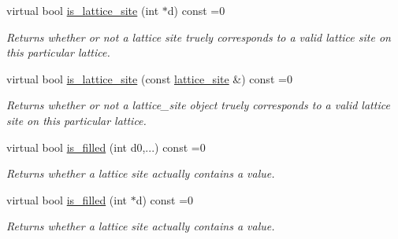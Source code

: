 \begin{DoxyCompactItemize}
\mbox{\label{classsisl_1_1base__lattice_affd433798fb68d45b7265c0bd5e9e1ac}} 
virtual bool \hyperlink{classsisl_1_1base__lattice_affd433798fb68d45b7265c0bd5e9e1ac}{is\+\_\+lattice\+\_\+site} (int $\ast$d) const =0
\begin{DoxyCompactList}\small\item\em Returns whether or not a lattice site truely corresponds to a valid lattice site on this particular lattice. \end{DoxyCompactList}\item 
\mbox{\label{classsisl_1_1base__lattice_aae9dc75c53a39031e2c8a5a4b9ce6855}} 
virtual bool \hyperlink{classsisl_1_1base__lattice_aae9dc75c53a39031e2c8a5a4b9ce6855}{is\+\_\+lattice\+\_\+site} (const \hyperlink{namespacesisl_acd18feee4026583db6185df2b25434aa}{lattice\+\_\+site} \&) const =0
\begin{DoxyCompactList}\small\item\em Returns whether or not a lattice\+\_\+site object truely corresponds to a valid lattice site on this particular lattice. \end{DoxyCompactList}\item 
\mbox{\label{classsisl_1_1base__lattice_a2a1746ce0ea77eb219a1667e88502fe4}} 
virtual bool \hyperlink{classsisl_1_1base__lattice_a2a1746ce0ea77eb219a1667e88502fe4}{is\+\_\+filled} (int d0,...) const =0
\begin{DoxyCompactList}\small\item\em Returns whether a lattice site actually contains a value. \end{DoxyCompactList}\item 
\mbox{\label{classsisl_1_1base__lattice_aa58f16669b8cc44aeaa71a87243e588d}} 
virtual bool \hyperlink{classsisl_1_1base__lattice_aa58f16669b8cc44aeaa71a87243e588d}{is\+\_\+filled} (int $\ast$d) const =0
\begin{DoxyCompactList}\small\item\em Returns whether a lattice site actually contains a value. \end{DoxyCompactList}\item 
\mbox{\label{classsisl_1_1base__lattice_a883cb05212eb7339bd73dd8ddf8968ca}} 

\end{DoxyCompactItemize}
